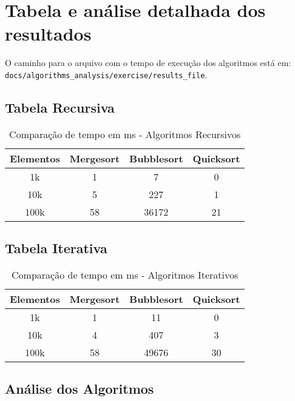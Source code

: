 \section{Tabela e análise detalhada dos resultados}

O caminho para o arquivo com o tempo de execução dos algoritmos está em: \newline
\texttt{docs/algorithms\_analysis/exercise/results\_file}.

\subsection{Tabela Recursiva}

\begin{table}[H]
    \centering
    \begin{tabular}{|c|c|c|c|}
        \hline
        \textbf{Elementos} & \textbf{Mergesort} & \textbf{Bubblesort} & \textbf{Quicksort} \\ \hline
        1k & 1 & 7 & 0 \\ \hline
        10k & 5 & 227 & 1 \\ \hline
        100k & 58 & 36172 & 21 \\ \hline
    \end{tabular}
    \caption{Comparação de tempo em ms - Algoritmos Recursivos}
\end{table}

\subsection{Tabela Iterativa}

\begin{table}[H]
    \centering
    \begin{tabular}{|c|c|c|c|}
        \hline
        \textbf{Elementos} & \textbf{Mergesort} & \textbf{Bubblesort} & \textbf{Quicksort} \\ \hline
        1k & 1 & 11 & 0 \\ \hline
        10k & 4 & 407 & 3 \\ \hline
        100k & 58 & 49676 & 30 \\ \hline
    \end{tabular}
    \caption{Comparação de tempo em ms - Algoritmos Iterativos}
\end{table}

\subsection{Análise dos Algoritmos}





